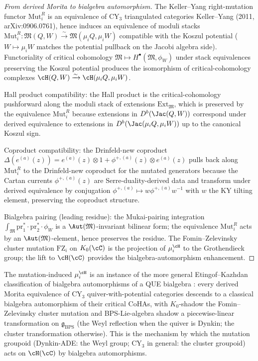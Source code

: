 \begin{proof}[From derived Morita to bialgebra automorphism]
 The Keller--Yang right-mutation functor $\mathrm{Mut}_i^R$ is an
 equivalence of CY$_3$ triangulated categories
 Keller--Yang (2011, arXiv:0906.0761), hence induces an equivalence of
 moduli stacks $\mathrm{Mut}_i^R \colon \mathfrak{M}(Q, W) \xrightarrow{\sim}
 \mathfrak{M}(\mu_i Q, \mu_i W)$ compatible with the Koszul potential
 ($W \mapsto \mu_i W$ matches the potential pullback on the Jacobi
 algebra side). Functoriality of critical cohomology
 $\mathfrak{M} \mapsto H^\bullet(\mathfrak{M}, \phi_W)$ under stack equivalences
 preserving the Koszul potential produces the isomorphism of
 critical-cohomology complexes $\cH(Q, W) \xrightarrow{\sim} \cH(\mu_i Q, \mu_i W)$.

 Hall product compatibility: the Hall product is the critical-cohomology
 pushforward along the moduli stack of extensions
 $\mathrm{Ext}_{\mathfrak{M}}$, which is preserved by the equivalence
 $\mathrm{Mut}_i^R$ because extensions in $D^b(\Jac(Q, W))$ correspond
 under derived equivalence to extensions in $D^b(\Jac(\mu_i Q, \mu_i W))$
 up to the canonical Koszul sign.

 Coproduct compatibility: the Drinfeld-new coproduct
 $\Delta(e^{(a)}(z)) = e^{(a)}(z) \otimes 1 + \phi^{+,(a)}(z) \otimes e^{(a)}(z)$
 pulls back along $\mathrm{Mut}_i^R$ to the Drinfeld-new coproduct for
 the mutated generators because the Cartan currents $\phi^{+,(a)}(z)$
 are Serre-duality-derived data and transform under derived equivalence
 by conjugation $\phi^{+,(a)} \mapsto w \phi^{+,(a)} w^{-1}$ with $w$
 the KY tilting element, preserving the coproduct structure.

 Bialgebra pairing (leading residue): the Mukai-pairing integration
 $\int_{\mathfrak{M}} \mathrm{pr}_1^* \cdot \mathrm{pr}_2^* \cdot \phi_W$ is a
 $\Aut(\mathfrak{M})$-invariant bilinear form; the equivalence
 $\mathrm{Mut}_i^R$ acts by an $\Aut(\mathfrak{M})$-element, hence preserves
 the residue. The Fomin--Zelevinsky cluster mutation $\mathrm{FZ}_i$
 on $K_0(\cC)$ is the projection of $\mu_i^\cH$ to the Grothendieck
 group; the lift to $\cH(\cC)$ provides the bialgebra-automorphism
 enhancement.
\end{proof}

\begin{remark}
 \label{rem:etingof-kazhdan-bialg-auto}
 The mutation-induced $\mu_i^\cH$ is an instance of the more general
 Etingof--Kazhdan classification of bialgebra automorphisms of a QUE
 bialgebra \cite[\S 5]{EtingofKazhdan1996}: every derived Morita
 equivalence of CY$_3$ quiver-with-potential categories descends to
 a classical bialgebra automorphism of their critical CoHAs, with
 $K_0$-shadow the Fomin--Zelevinsky cluster mutation and BPS-Lie-algebra
 shadow a piecewise-linear transformation on $\mathfrak{g}_{\mathrm{BPS}}$
 (the Weyl reflection when the quiver is Dynkin; the cluster
 transformation otherwise). This is the mechanism by which the mutation
 groupoid (Dynkin-ADE: the Weyl group; CY$_3$ in general: the cluster
 groupoid) acts on $\cH(\cC)$ by bialgebra automorphisms.
\end{remark}

